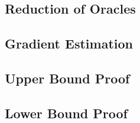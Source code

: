 
\subsection{Reduction of Oracles}
\label{sec:orrel}


\subsection{Gradient Estimation}
\label{sec:appendix-grad}


\subsection{Upper Bound Proof}
\label{sec:appendix-md}


\subsection{Lower Bound Proof}
\label{sec:appendix-lb-proof}



